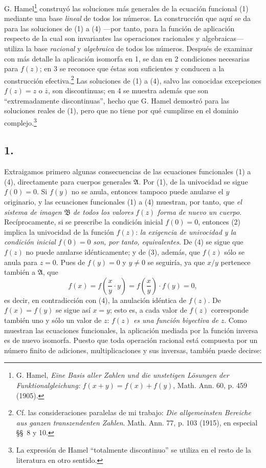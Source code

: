 G. Hamel\footnote{G. Hamel, \emph{Eine Basis aller Zahlen und die unstetigen Lösungen der Funktionalgleichung:} $f(x+y)=f(x)+f(y)$, Math. Ann. 60, p. 459 (1905).} construyó las soluciones más generales de la ecuación funcional (1) mediante una base \emph{lineal} de todos los números. La construcción que aquí se da para las soluciones de (1) a (4) ---por tanto, para la función de aplicación respecto de la cual son invariantes las operaciones racionales y algebraicas--- utiliza la base \emph{racional} y \emph{algebraica} de todos los números. Después de examinar con más detalle la aplicación isomorfa en 1, se dan en 2 condiciones necesarias para $f(z)$; en 3 se reconoce que éstas son suficientes y conducen a la construcción efectiva.\footnote{Cf. las consideraciones paralelas de mi trabajo: \emph{Die allgemeinsten Bereiche aus ganzen transzendenten Zahlen}. Math. Ann. 77, p. 103 (1915), en especial \S\S\ 8 y 10.} Las soluciones de (1) a (4), salvo las conocidas excepciones $f(z)=z$ o $\overline z$, son discontinuas; en 4 se muestra además que son ``extremadamente discontinuas'', hecho que G. Hamel demostró para las soluciones reales de (1), pero que no tiene por qué cumplirse en el dominio complejo.\footnote{La expresión de Hamel ``totalmente discontinuo'' se utiliza en el resto de la literatura en otro sentido.}

\subsection*{1.}

Extraigamos primero algunas consecuencias de las ecuaciones funcionales (1) a (4), directamente para cuerpos generales $\mathfrak A$. Por (1), de la univocidad se sigue $f(0)=0$. Si $f(y)$ no se anula, entonces tampoco puede anularse el $y$ originario, y las ecuaciones funcionales (1) a (4) muestran, por tanto, que \emph{el sistema de imagen} $\mathfrak B$ \emph{de todos los valores} $f(z)$ \emph{forma de nuevo un cuerpo}. Recíprocamente, si se prescribe la condición inicial $f(0)=0$, entonces (2) implica la univocidad de la función $f(z)$: \emph{la exigencia de univocidad y la condición inicial} $f(0)=0$ \emph{son, por tanto, equivalentes}. De (4) se sigue que $f(z)$ no puede anularse idénticamente; y de (3), además, que $f(z)$ sólo se anula para $z=0$. Pues de $f(y)=0$ y $y\ne0$ se seguiría, ya que $x/y$ pertenece también a $\mathfrak A$, que
\[
f(x)=f\!\left(\frac{x}{y}\cdot y\right)=f\!\left(\frac{x}{y}\right)\cdot f(y)=0,
\]
es decir, en contradicción con (4), la anulación idéntica de $f(z)$. De $f(x)=f(y)$ se sigue así $x=y$; esto es, a cada valor de $f(z)$ corresponde también uno y sólo un valor de $z$: \emph{$f(z)$ es una función biyectiva de} $z$. Como muestran las ecuaciones funcionales, la aplicación mediada por la función inversa es de nuevo isomorfa. Puesto que toda operación racional está compuesta por un número finito de adiciones, multiplicaciones y sus inversas, también puede decirse:

